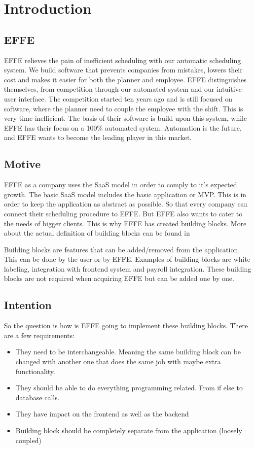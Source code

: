 \chapter{Introduction}

\section{EFFE}
EFFE relieves the pain of inefficient scheduling with our automatic scheduling system. We build software that prevents companies from mistakes, lowers their cost and makes it easier for both the planner and employee. EFFE distinguishes themselves, from competition through our automated system and our intuitive user interface. The competition started ten years ago and is still focused on software, where the planner need to couple the employee with the shift. This is very time-inefficient. The basis of their software is build upon this system, while EFFE has their focus on a 100\% automated system. Automation is the future, and EFFE wants to become the leading player in this market.

\section{Motive}
EFFE as a company uses the SaaS model in order to comply to it’s expected growth. The basic SaaS model includes the basic application or MVP. This is in order to keep the application as abstract as possible. So that every company can connect their scheduling procedure to EFFE. But EFFE also wants to cater to the needs of bigger clients. This is why EFFE has created building blocks. More about the actual definition of building blocks can be found in 

Building blocks are features that can be added/removed from the application. This can be done by the user or by EFFE. Examples of building blocks are white labeling, integration with frontend system and payroll integration. These building blocks are not required when acquiring EFFE but can be added one by one.

\section{Intention}
\label{sec:Intention}

So the question is how is EFFE going to implement these building blocks. There are a few requirements:
\begin{itemize}
	\item They need to be interchangeable. Meaning the same building block can be changed with another one that does the same job with maybe extra functionality.

	\item They should be able to do everything programming related. From if else to database calls.

	\item They have impact on the frontend as well as the backend

	\item Building block should be completely separate from the application (loosely coupled)
\end{itemize}
